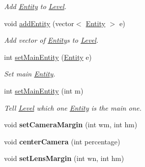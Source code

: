 \begin{DoxyCompactItemize}
\begin{DoxyCompactList}\small\item\em Add \hyperlink{classEntity}{Entity} to \hyperlink{classLevel}{Level}. \end{DoxyCompactList}\item 
void \hyperlink{classLevel_a6c4584d5aa383888461406de600a43c1}{add\+Entity} (vector$<$ \hyperlink{classEntity}{Entity} $>$ e)\hypertarget{classLevel_a6c4584d5aa383888461406de600a43c1}{}\label{classLevel_a6c4584d5aa383888461406de600a43c1}

\begin{DoxyCompactList}\small\item\em Add vector of \hyperlink{classEntity}{Entity}\textquotesingle{}s to \hyperlink{classLevel}{Level}. \end{DoxyCompactList}\item 
int \hyperlink{classLevel_afc8426f1adb6037dd71b26e4bd63db92}{set\+Main\+Entity} (\hyperlink{classEntity}{Entity} e)\hypertarget{classLevel_afc8426f1adb6037dd71b26e4bd63db92}{}\label{classLevel_afc8426f1adb6037dd71b26e4bd63db92}

\begin{DoxyCompactList}\small\item\em Set main \hyperlink{classEntity}{Entity}. \end{DoxyCompactList}\item 
int \hyperlink{classLevel_ab7cf0af8d8c89da5a2dc9d3e3b978637}{set\+Main\+Entity} (int m)\hypertarget{classLevel_ab7cf0af8d8c89da5a2dc9d3e3b978637}{}\label{classLevel_ab7cf0af8d8c89da5a2dc9d3e3b978637}

\begin{DoxyCompactList}\small\item\em Tell \hyperlink{classLevel}{Level} which one \hyperlink{classEntity}{Entity} is the main one. \end{DoxyCompactList}\item 
void {\bfseries set\+Camera\+Margin} (int wm, int hm)\hypertarget{classLevel_a69a4cae59576b540090202ab3c22e8d5}{}\label{classLevel_a69a4cae59576b540090202ab3c22e8d5}

\item 
void {\bfseries center\+Camera} (int percentage)\hypertarget{classLevel_ae2df583cad2a4bbda86e4043d4b81a70}{}\label{classLevel_ae2df583cad2a4bbda86e4043d4b81a70}

\item 
void {\bfseries set\+Lens\+Margin} (int wn, int hm)\hypertarget{classLevel_a72667cfc3b4e98433f4faac78e30e83e}{}\label{classLevel_a72667cfc3b4e98433f4faac78e30e83e}


\end{DoxyCompactItemize}
